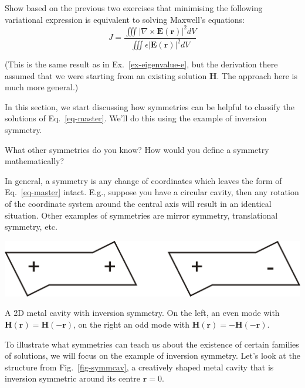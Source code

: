 \begin{exer}
Show based on the previous two exercises that minimising the following variational expression is equivalent to solving Maxwell's equations: \\

$$J=\frac{\iiint \left| \nabla \times {\mathbf E ({\mathbf r})} \right| ^2  dV} {\iiint \epsilon \left| {\mathbf E ({\mathbf r})} \right| ^2  dV}$$

(This is the same result as in Ex.~\ref{ex-eigenvalue-e}, but the derivation there assumed that we were starting from an existing solution $\mathbf H$. The approach here is much more general.)

\end{exer}


\pagebreak



In this section, we start discussing how symmetries can be helpful to classify the solutions of Eq.~\ref{eq-master}. We'll do this using the example of inversion symmetry.

\begin{cue}
What other symmetries do you know? How would you define a symmetry mathematically?  
\end{cue}

In general, a symmetry is any change of coordinates which leaves the form of Eq.~\ref{eq-master} intact. E.g., suppose you have a circular cavity, then any rotation of the coordinate system around the central axis will result in an identical situation. Other examples of symmetries are mirror symmetry, translational symmetry, etc. 

\begin{marginfigure}
\centering
\includegraphics{symmetry/figures/symmcav}
\caption{A 2D metal cavity with inversion symmetry. On the left, an even mode with ${\mathbf H}({\mathbf r}) = {\mathbf H}(-{\mathbf r})$, on the right an odd mode with ${\mathbf H}({\mathbf r})=-{\mathbf H}(-{\mathbf r})$.}
\label{fig-symmcav}
\end{marginfigure}

To illustrate what symmetries can teach us about the existence of certain families of solutions, we will focus on the example of inversion symmetry. Let's look at the structure from Fig.~\ref{fig-symmcav}, a creatively shaped metal cavity that is inversion symmetric around its centre $\mathbf{r}=0$.

